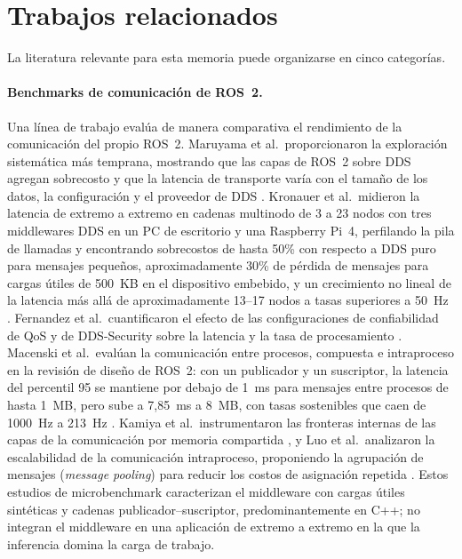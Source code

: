 \section{Trabajos relacionados}
\label{sec:related-work}

La literatura relevante para esta memoria puede organizarse en cinco
categorías.

\paragraph{Benchmarks de comunicación de ROS~2.}
Una línea de trabajo evalúa de manera comparativa el rendimiento de la
comunicación del propio ROS~2. Maruyama et al.\ proporcionaron la
exploración sistemática más temprana, mostrando que las capas de ROS~2 sobre
DDS agregan sobrecosto y que la latencia de transporte varía con el tamaño
de los datos, la configuración y el proveedor de DDS \cite{maruyama2016}.
Kronauer et al.\ midieron la latencia de extremo a extremo en cadenas
multinodo de 3 a 23 nodos con tres middlewares DDS en un PC de escritorio y
una Raspberry Pi~4, perfilando la pila de llamadas y encontrando sobrecostos
de hasta 50\% con respecto a DDS puro para mensajes pequeños,
aproximadamente 30\% de pérdida de mensajes para cargas útiles de 500~KB en
el dispositivo embebido, y un crecimiento no lineal de la latencia más allá
de aproximadamente 13--17 nodos a tasas superiores a 50~Hz
\cite{kronauer2021}. Fernandez et al.\ cuantificaron el efecto de las
configuraciones de confiabilidad de QoS y de DDS-Security sobre la latencia
y la tasa de procesamiento \cite{fernandez2020}. Macenski et al.\ evalúan la
comunicación entre procesos, compuesta e intraproceso en la revisión de
diseño de ROS~2: con un publicador y un suscriptor, la latencia del
percentil 95 se mantiene por debajo de 1~ms para mensajes entre procesos de
hasta 1~MB, pero sube a 7,85~ms a 8~MB, con tasas sostenibles que caen de
1000~Hz a 213~Hz \cite{macenski2022}. Kamiya et al.\ instrumentaron las
fronteras internas de las capas de la comunicación por memoria compartida
\cite{kamiya2025}, y Luo et al.\ analizaron la escalabilidad de la
comunicación intraproceso, proponiendo la agrupación de mensajes
(\emph{message pooling}) para reducir los costos de asignación repetida
\cite{luo2025}. Estos estudios de microbenchmark caracterizan el middleware
con cargas útiles sintéticas y cadenas publicador--suscriptor,
predominantemente en C++; no integran el middleware en una aplicación de
extremo a extremo en la que la inferencia domina la carga de trabajo.

